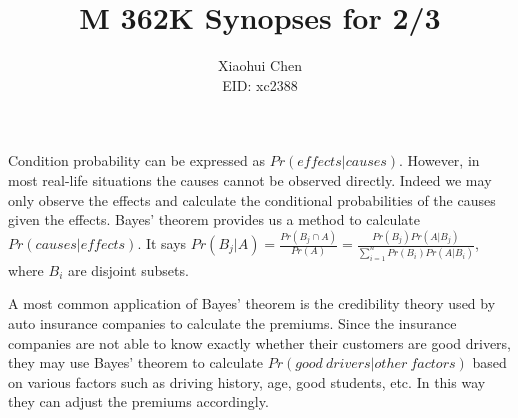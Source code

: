 \documentclass[12pt]{article}
\author{Xiaohui Chen \\EID: xc2388}
\title{M 362K Synopses for 2/3}
\begin{document}
\maketitle
\begin{spacing}{2.0}

Condition probability can be expressed as $Pr(effects|causes)$. However, in most real-life situations the causes cannot be observed directly. Indeed we may only observe the effects and calculate the conditional probabilities of the causes given the effects. Bayes' theorem provides us a method to calculate $Pr(causes|effects)$. It says $Pr(B_j|A)=\frac{Pr(B_j\cap A)}{Pr(A)}=\frac{Pr(B_j)Pr(A|B_j)}{\sum_{i=1}^{n} Pr(B_i)Pr(A|B_i)}$, where $B_i$ are disjoint subsets. 

A most common application of Bayes' theorem is the credibility theory used by auto insurance companies to calculate the premiums. Since the insurance companies are not able to know exactly whether their customers are good drivers, they may use Bayes' theorem to calculate $Pr(good\ drivers|other\ factors)$ based on various factors such as driving history, age, good students, etc. In this way they can adjust the premiums accordingly.

\end{spacing}
\end{document}
